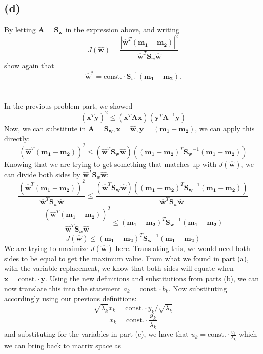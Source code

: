 \documentclass{article}
\begin{document}
{\subsection*{(d)}
By letting \(\mathbf{A} = \mathbf{S_w}\) in the expression above, and writing 
\[
  J(\hat{\mathbf{w}}) = \frac{|\hat{\mathbf{w}}^T (\mathbf{m_1} - \mathbf{m_2})|^2}{\hat{\mathbf{w}}^T \mathbf{S}_w \hat{\mathbf{w}}}
\]
show again that 
\[
  \hat{\mathbf{w}}^* = \text{const.} \cdot \mathbf{S}_w^{-1} (\mathbf{m_1} - \mathbf{m_2}).
\] \\ \\
In the previous problem part, we showed 
\[
  (\mathbf{x}^T \mathbf{y})^2 \leq (\mathbf{x}^T \mathbf{Ax}) (\mathbf{y}^T \mathbf{A}^{-1} \mathbf{y})
\]
Now, we can substitute in \(\mathbf{A} = \mathbf{S_w}, \mathbf{x} = \hat{\mathbf{w}}, \mathbf{y} = (\mathbf{m_1} - \mathbf{m_2})\), we can apply this directly:
\[
  (\hat{\mathbf{w}}^T (\mathbf{m_1} - \mathbf{m_2}))^2 \leq (\hat{\mathbf{w}}^T \mathbf{S_w} \hat{\mathbf{w}}) ((\mathbf{m_1} - \mathbf{m_2})^T \mathbf{S_w}^{-1} (\mathbf{m_1} - \mathbf{m_2}))
\]
Knowing that we are trying to get something that matches up with \(J(\hat{\mathbf{w}})\), we can divide both sides by \(\hat{\mathbf{w}}^T \mathbf{S}_w \hat{\mathbf{w}}\):
\[
  \frac{(\hat{\mathbf{w}}^T (\mathbf{m_1} - \mathbf{m_2}))^2}{\hat{\mathbf{w}}^T \mathbf{S}_w \hat{\mathbf{w}}} \leq \frac{(\hat{\mathbf{w}}^T \mathbf{S_w} \hat{\mathbf{w}}) ((\mathbf{m_1} - \mathbf{m_2})^T \mathbf{S_w}^{-1} (\mathbf{m_1} - \mathbf{m_2}))}{\hat{\mathbf{w}}^T \mathbf{S}_w \hat{\mathbf{w}}}
\]
\[
  \frac{(\hat{\mathbf{w}}^T (\mathbf{m_1} - \mathbf{m_2}))^2}{\hat{\mathbf{w}}^T \mathbf{S}_w \hat{\mathbf{w}}} \leq (\mathbf{m_1} - \mathbf{m_2})^T \mathbf{S_w}^{-1} (\mathbf{m_1} - \mathbf{m_2})
\]
\[
  J(\hat{\mathbf{w}}) \leq (\mathbf{m_1} - \mathbf{m_2})^T \mathbf{S_w}^{-1} (\mathbf{m_1} - \mathbf{m_2})
\]
We are trying to maximize \(J(\hat{\mathbf{w}})\) here. Translating this, we would need both sides to be equal to get the maximum value. From what we found in part (a), with the variable replacement, we know that both sides will equate when \(\mathbf{x} = \text{const.} \cdot \mathbf{y}\). Using the new definitions and substitutions from parts (b), we can now translate this into the statement \(a_k = \text{const.} \cdot b_k\). Now substituting accordingly using our previous definitions:
\[
  \sqrt{\lambda_k} x_k = \text{const.} \cdot y_k / \sqrt{\lambda_k}
\]
\[
  x_k = \text{const.} \cdot \frac{y_k}{\lambda_k}
\]
and substituting for the variables in part (c), we have that \(u_k = \text{const.} \cdot \frac{v_k}{\lambda_k}\) which we can bring back to matrix space as 
}
\end{document}

